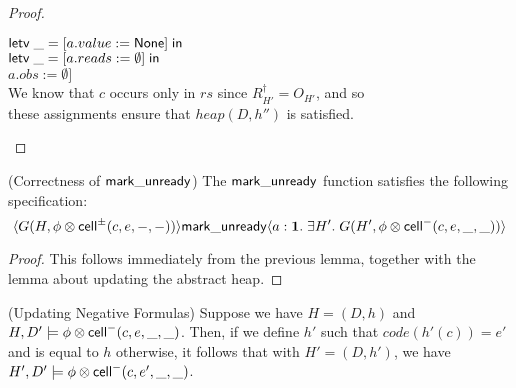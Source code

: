 \begin{proof}
\begin{tabbedproof}
\oooo $\mathsf{letv}\;\_ = [a.value := \mathsf{None}]\;\mathsf{in}\;$ \\
\oooo $\mathsf{letv}\;\_ = [a.reads := \emptyset]\;\mathsf{in}\;$ \\
\oooo $a.obs := \emptyset]$ \\
\oooo We know that $c$ occurs only in $rs$ since $R^\dagger_{H'} = O_{H'}$, and so \\ 
\oooo these assignments ensure that $\mathit{heap}(D, h'')$ is satisfied. \\
\end{tabbedproof}
\end{proof}

\begin{lemma}{(Correctness of $\mathsf{mark\_unready}$)}
The $\mathsf{mark\_unready}$ function satisfies the following specification:   
\begin{displaymath}
\langle{G(H, \phi \otimes \mathsf{cell}^{\pm}({c}, {e}, {-}, {-}))}\rangle{\mathsf{mark\_unready}}\langle{a:\mathbf{1}}.\;{\exists H'.\;G(H', \phi \otimes \mathsf{cell}^{-}({c}, {e}, {\_}, {\_}))}\rangle
\end{displaymath}
\end{lemma}

\begin{proof}
  This follows immediately from the previous lemma, together with the lemma about updating the 
abstract heap. 
\end{proof}


\begin{lemma}{(Updating Negative Formulas)}
Suppose we have  $H = (D,h)$ and $H, D' \models \phi \otimes \mathsf{cell}^{-}({c}, {e}, {\_}, {\_})$. Then, if
we define $h'$ such that $\mathit{code}(h'(c)) = e'$ and is equal to $h$ otherwise, 
it follows that with $H' = (D,h')$, we have $H', D' \models \phi \otimes \mathsf{cell}^{-}({c}, {e'}, {\_}, {\_})$. 
\end{lemma}

